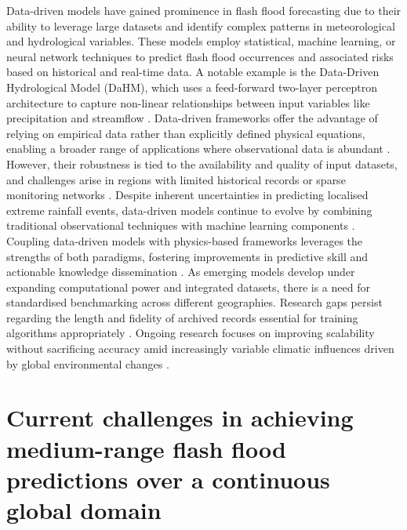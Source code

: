 Data-driven  models have gained prominence in flash flood forecasting due to their ability to leverage large datasets and identify complex patterns in meteorological and hydrological variables. These models employ statistical, machine learning, or neural network techniques to predict flash flood occurrences and associated risks based on historical and real-time data. A notable example is the Data-Driven Hydrological Model (DaHM), which uses a feed-forward two-layer perceptron architecture to capture non-linear relationships between input variables like precipitation and streamflow \citep{Philipp2016}. Data-driven frameworks offer the advantage of relying on empirical data rather than explicitly defined physical equations, enabling a broader range of applications where observational data is abundant \citep{Zanchetta2020, Msigwa2024}. However, their robustness is tied to the availability and quality of input datasets, and challenges arise in regions with limited historical records or sparse monitoring networks \citep{Zanchetta2020, Lu2021}. Despite inherent uncertainties in predicting localised extreme rainfall events, data-driven models continue to evolve by combining traditional observational techniques with machine learning components \citep{AlRawas2024}. Coupling data-driven models with physics-based frameworks leverages the strengths of both paradigms, fostering improvements in predictive skill and actionable knowledge dissemination \citep{Msigwa2024}. As emerging models develop under expanding computational power and integrated datasets, there is a need for standardised benchmarking across different geographies. Research gaps persist regarding the length and fidelity of archived records essential for training algorithms appropriately \citep{Zanchetta2020}. Ongoing research focuses on improving scalability without sacrificing accuracy amid increasingly variable climatic influences driven by global environmental changes \citep{AlRawas2024, Lu2021}.


\section{Current challenges in achieving medium-range flash flood predictions over a continuous global domain}

